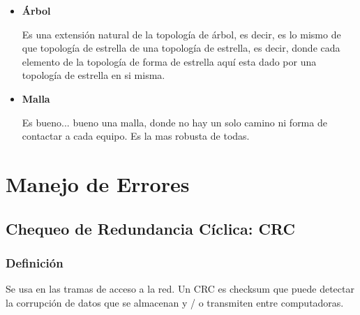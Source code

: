 \documentclass[12pt, fleqn]{report}                             %
\theoremstyle{break}                                            %
\begin{document}
\begin{itemize}
                \clearpage

                \item \textbf{Árbol}
                
                    Es una extensión natural de la topología de árbol, es decir, es lo mismo de que topología
                    de estrella de una topología de estrella, es decir, donde cada elemento de la topología
                    de forma de estrella aquí esta dado por una topología de estrella en si misma.

                \item \textbf{Malla}
                
                    Es bueno... bueno una malla, donde no hay un solo camino ni forma de contactar a cada equipo.
                    Es la mas robusta de todas.

            \end{itemize}



    \chapter{Manejo de Errores}


        \clearpage
        \section{Chequeo de Redundancia Cíclica: CRC}

            \subsection{Definición}

                Se usa en las tramas de acceso a la red.
                Un CRC es checksum que puede detectar la corrupción de datos que se
                almacenan y / o transmiten entre computadoras. 
\end{document}
